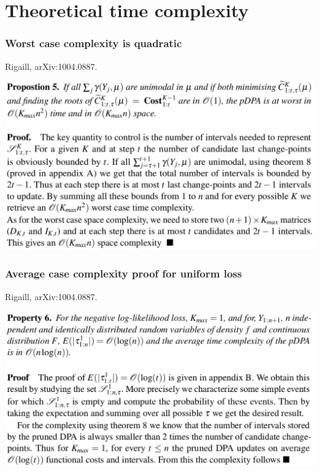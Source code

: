\documentclass{beamer}
\begin{document}
\begin{frame}[fragile]
\end{frame}

\section{Theoretical time complexity}

\begin{frame}
  \frametitle{Worst case complexity is quadratic}
  Rigaill, arXiv:1004.0887.
  
  \includegraphics[width=\textwidth]{screenshot-proposition-5}
\end{frame}

\begin{frame}
  \frametitle{Average case complexity proof for uniform loss}
  Rigaill, arXiv:1004.0887.
  
  \includegraphics[width=\textwidth]{screenshot-proposition-6}
\end{frame} 
\end{document}

